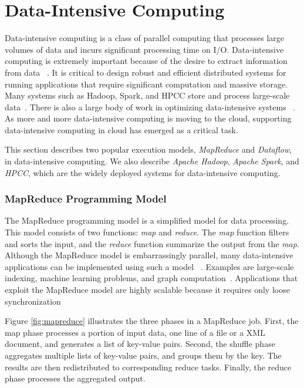 \section{Data-Intensive Computing}

Data-intensive computing is a class of parallel computing that
processes large volumes of data and
incurs significant processing time on I/O.
Data-intensive computing is extremely important because of
the desire to extract information from data
~\cite{KouzesR2009_ChangingParadigm, TolleKris2011FourthParadigm}.
It is critical to design robust and efficient distributed systems
for running applications that require
significant computation and massive storage.
Many systems such as
Hadoop, Spark, and HPCC
store and process large-scale data~\cite{hadoop,spark,hpcc}.
There is also a large body of work in optimizing
data-intensive systems
~\cite{Ananthanarayanan2011,Eltabakh2011,Cruz2013,Lim2010,Rodrigues2013}.
As more and more data-intensive computing is moving to the cloud,
supporting data-intensive computing in cloud has emerged as a critical task.

This section describes two popular execution models,
\emph{MapReduce} and \emph{Dataflow}, in data-intensive computing.
We also describe \emph{Apache Hadoop}, \emph{Apache Spark}, and \emph{HPCC},
which are the widely deployed systems for data-intensive computing.


\subsubsection*{MapReduce Programming Model}

The MapReduce programming model is a simplified model for data processing.
This model consists of two functions: \emph{map} and \emph{reduce}.
The \emph{map} function filters and sorts the input, and
the \emph{reduce} function summarize the output from the \emph{map}.
Although the MapReduce model is embarrassingly parallel,
many data-intensive applications can be implemented using such a model
~\cite{MolerC1986_Embarassing, FosterI1995_Parallel}.
Examples are large-scale indexing, machine learning problems, and
graph computation~\cite{DeanJ2004_MapReduce, hadoop}.
Applications that exploit the MapReduce model are highly scalable because
it requires only loose synchronization~\cite{ShaferJ2010_PhD}

Figure \ref{fig:mapreduce} illustrates the three phases in a MapReduce job.
First, the map phase processes a portion of input data,
\eg one line of a file or a XML document, and
generates a list of key-value pairs.
Second, the shuffle phase aggregates multiple lists of key-value pairs, and
groups them by the key.
The results are then redistributed to corresponding reduce tasks.
Finally, the reduce phase processes the aggregated output.

